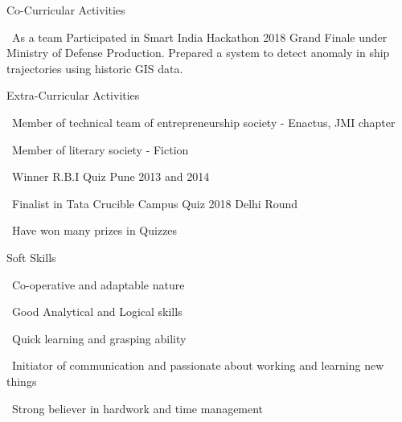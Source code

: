 \begin{rSection}{Co-Curricular Activities} \itemsep -2pt
\item \textbullet \ As a team Participated in Smart India Hackathon 2018 Grand Finale under Ministry of Defense Production. Prepared a system to detect anomaly in ship trajectories using historic GIS data.
\end{rSection}

\begin{rSection}{Extra-Curricular Activities} \itemsep -3pt
  \item \textbullet \ Member of technical team of entrepreneurship society - Enactus, JMI chapter
  \item \textbullet \ Member of literary society - Fiction
	\item \textbullet \ Winner R.B.I Quiz Pune 2013 and 2014
	\item \textbullet \ Finalist in Tata Crucible Campus Quiz 2018 Delhi Round
	\item \textbullet \ Have won many prizes in Quizzes
\end{rSection}

\begin{rSection}{Soft Skills}
  \itemsep -3pt
 \item \textbullet \ Co-operative and adaptable nature
 \item \textbullet \ Good Analytical and Logical skills
 \item \textbullet \ Quick learning and grasping ability 
 \item \textbullet \ Initiator of communication and passionate about working and learning new things 
 \item \textbullet \ Strong believer in hardwork and time management
\end{rSection}





              
